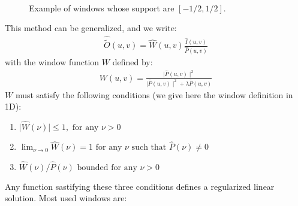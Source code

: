 \documentclass[11pt,a4paper]{article}
\begin{document}
\begin{figure}[htb] 
\centerline{
\hbox{
}}
\caption{Example of windows whose support are $[-1/2,1/2]$.}
\label{fig_window}
\end{figure}

This method can be generalized, and we write:
 \begin{eqnarray}
\hat{\tilde{O}}(u,v)  = \hat{W}(u,v) \frac{ \hat{I}(u,v)}{ \hat{P}(u,v)  }
\end{eqnarray}
with the window function $W$ defined by:
\begin{eqnarray}
W(u,v) = \frac{\mid \hat{P}(u,v) \mid^2}{\mid \hat{P}(u,v) \mid^2 + \lambda \hat{P}(u,v)}
\end{eqnarray}
$W$ must satisfy the following conditions \cite{ima:bertero98}
(we give here the window definition in 1D):
\begin{enumerate}
\item $\mid \hat{W}(\nu) \mid \le 1, \mbox{ for any } \nu  > 0$
\item $\lim_{\nu \rightarrow 0} \hat{W}(\nu)  = 1 \mbox{ for any $\nu$ such that } \hat{P}(\nu) \ne 0$
\item $\hat{W}(\nu) / \hat{P}(\nu) \mbox{ bounded for any  } \nu > 0$
\end{enumerate}
Any function sastifying these three conditions defines a regularized linear
solution. Most used windows are:
\end{document}
